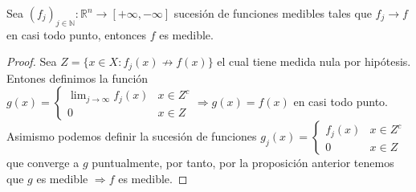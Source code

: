 \begin{corolario}
    Sea $(f_j)_{j \in \mathbb{N}}: \mathbb{R}^n \to [+\infty, -\infty]$ sucesión de funciones medibles tales que $f_j \to f$ en casi todo punto, entonces $f$ es medible.
\end{corolario}
\begin{proof}
    Sea $Z = \{x \in X : f_j(x) \not\to f(x)\}$ el cual tiene medida nula por hipótesis. Entones definimos la función $g(x) = \begin{cases} \lim_{j \to \infty}f_j(x) & x \in Z^c \\ 0 & x \in Z \end{cases} \Rightarrow g(x) = f(x)$ en casi todo punto. Asimismo podemos definir la sucesión de funciones $g_j(x) = \begin{cases} f_j(x) & x \in Z^c \\ 0 & x \in Z \end{cases}$ que converge a $g$ puntualmente, por tanto, por la proposición anterior tenemos que $g$ es medible $\Rightarrow f$ es medible.
\end{proof}

